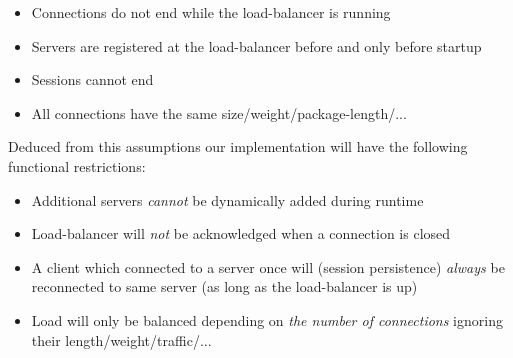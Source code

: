 \documentclass[11pt, a4paper]{article}
\begin{document}
\vspace{-10pt}
\begin{itemize}
	\item Connections do not end while the load-balancer is running
	\item Servers are registered at the load-balancer before and only before startup
	\item Sessions cannot end
	\item All connections have the same size/weight/package-length/...
\end{itemize}
\vspace{-10pt}

Deduced from this assumptions our implementation will have the following functional restrictions:

\vspace{-10pt}
\begin{itemize}
	\item Additional servers \textit{cannot} be dynamically added during runtime
	\item Load-balancer will \textit{not} be acknowledged when a connection is closed
	\item A client which connected to a server once will (session persistence) \textit{always} be reconnected to same server (as long as the load-balancer is up)
	\item Load will only be balanced depending on \textit{the number of connections} ignoring their length/weight/traffic/...
\end{itemize}
\vspace{-10pt}


\nocite{*}


\end{document}

